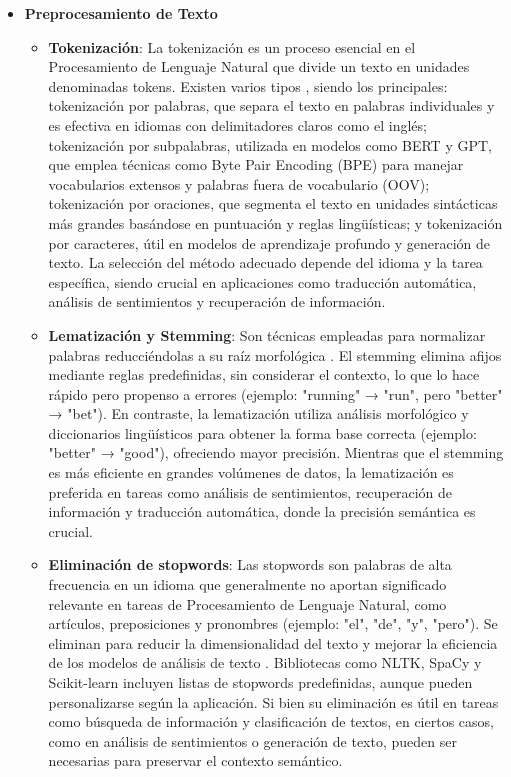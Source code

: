 \begin{itemize}
    \item \textbf{Preprocesamiento de Texto}
        \begin{itemize}
            \item \textbf{Tokenización}: La tokenización es un proceso esencial en el Procesamiento de Lenguaje Natural que divide un texto en unidades denominadas tokens. 
            Existen varios tipos \cite{schmidt2024tokenizationcompression}, siendo los principales: tokenización por palabras, que separa el texto en palabras individuales y es efectiva en idiomas con delimitadores claros como el inglés; 
            tokenización por subpalabras, utilizada en modelos como BERT y GPT, que emplea técnicas como Byte Pair Encoding (BPE) para manejar vocabularios extensos y palabras fuera de vocabulario (OOV); 
            tokenización por oraciones, que segmenta el texto en unidades sintácticas más grandes basándose en puntuación y reglas lingüísticas; y tokenización por caracteres, útil en modelos de aprendizaje profundo y generación de texto. 
            La selección del método adecuado depende del idioma y la tarea específica, siendo crucial en aplicaciones como traducción automática, análisis de sentimientos y recuperación de información.
            
            \item \textbf{Lematización y Stemming}: Son técnicas empleadas para normalizar palabras reducciéndolas a su raíz morfológica \cite{steminglemmatization}. 
            El stemming elimina afijos mediante reglas predefinidas, sin considerar el contexto, lo que lo hace rápido pero propenso a errores (ejemplo: "running" → "run", pero "better" → "bet"). 
            En contraste, la lematización utiliza análisis morfológico y diccionarios lingüísticos para obtener la forma base correcta (ejemplo: "better" → "good"), ofreciendo mayor precisión. 
            Mientras que el stemming es más eficiente en grandes volúmenes de datos, la lematización es preferida en tareas como análisis de sentimientos, recuperación de información y traducción automática, donde la precisión semántica es crucial.
            
            \item \textbf{Eliminación de stopwords}: Las stopwords son palabras de alta frecuencia en un idioma que generalmente no aportan significado relevante en tareas de Procesamiento de Lenguaje Natural, como artículos, preposiciones y pronombres (ejemplo: "el", "de", "y", "pero"). 
            Se eliminan para reducir la dimensionalidad del texto y mejorar la eficiencia de los modelos de análisis de texto \cite{Sarica_2021}. 
            Bibliotecas como NLTK, SpaCy y Scikit-learn incluyen listas de stopwords predefinidas, aunque pueden personalizarse según la aplicación. 
            Si bien su eliminación es útil en tareas como búsqueda de información y clasificación de textos, en ciertos casos, como en análisis de sentimientos o generación de texto, pueden ser necesarias para preservar el contexto semántico.
        \end{itemize}


\end{itemize}
